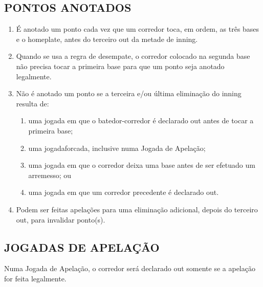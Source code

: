\subsection{PONTOS ANOTADOS}
\begin{enumerate}[label=(\alph*)]
	\item É anotado um ponto cada vez que um corredor toca, em ordem, as três bases e o \gls{homeplate}, antes do terceiro \gls{out} da metade de \gls{inning}.
	\item  Quando se usa a regra de desempate, o corredor colocado na segunda base não precisa tocar a primeira base para que um ponto seja anotado legalmente.
	\item  Não é anotado um ponto se a terceira e/ou última eliminação do \gls{inning} resulta de:
	\begin{enumerate}[label=\roman*.]
		\item uma jogada em que o batedor-corredor é declarado \gls{out} antes de tocar a  primeira base;
		\item  uma \gls{jogadaforcada}, inclusive numa Jogada de Apelação;
		\item  uma jogada em que o corredor deixa uma base antes de ser efetuado um arremesso; ou
		\item  uma jogada em que um corredor precedente é declarado \gls{out}.
	\end{enumerate}
	\item  Podem ser feitas apelações para uma eliminação adicional, depois do terceiro \gls{out}, para invalidar ponto(s).

\end{enumerate}
\subsection{JOGADAS DE APELAÇÃO}

Numa Jogada de Apelação, o corredor será declarado \gls{out} somente se a  apelação for feita legalmente.

